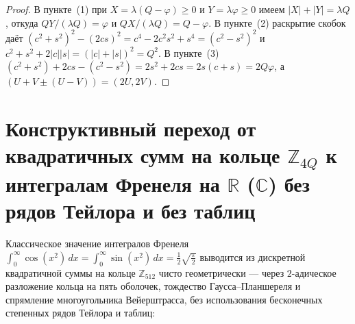 \begin{proof}
\leanok
В пункте~(1) при $X = \lambda(Q - \varphi) \ge 0$ и $Y = \lambda\varphi \ge 0$ имеем $|X| + |Y| = \lambda Q$, откуда $Q Y / (\lambda Q) = \varphi$ и $Q X / (\lambda Q) = Q - \varphi$. В пункте~(2) раскрытие скобок даёт $(c^2+s^2)^2 - (2cs)^2 = c^4 - 2c^2s^2 + s^4 = (c^2-s^2)^2$ и $c^2 + s^2 + 2|c||s| = (|c|+|s|)^2 = Q^2$. В пункте~(3) $(c^2+s^2) + 2cs - (c^2-s^2) = 2s^2 + 2cs = 2s(c+s) = 2Q\varphi$, а $(U+V \pm (U-V)) = (2U, 2V)$.
\end{proof}

\section{Конструктивный переход от квадратичных сумм на кольце \texorpdfstring{$\mathbb{Z}_{4Q}$}{Z\_4Q} к интегралам Френеля на \texorpdfstring{$\mathbb{R}$ ($\mathbb{C}$)}{R (C)} без рядов Тейлора и без таблиц}

Классическое значение интегралов Френеля $\int_0^\infty \cos(x^2)\,dx = \int_0^\infty \sin(x^2)\,dx = \frac{1}{2}\sqrt{\frac{\pi}{2}}$ выводится из дискретной квадратичной суммы на кольце $\mathbb{Z}_{512}$ чисто геометрически --- через $2$-адическое разложение кольца на пять оболочек, тождество Гаусса--Планшереля и спрямление многоугольника Вейерштрасса, без использования бесконечных степенных рядов Тейлора и таблиц:

